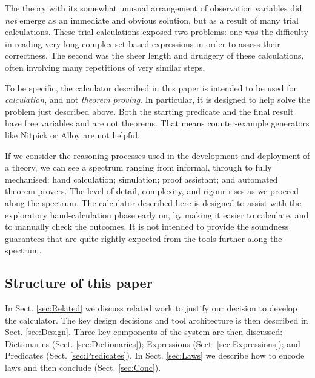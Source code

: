 The theory with its somewhat unusual arrangement of observation variables
did \emph{not} emerge as an immediate and obvious solution,
but as a result of many trial calculations.
These trial calculations exposed two problems:
one was the difficulty in reading very long complex
set-based expressions in order to assess their correctness.
The second was the sheer length and drudgery of these calculations,
often involving many repetitions of very similar steps.

To be specific, the calculator described in this paper
is intended to be used for \emph{calculation}, and not \emph{theorem proving}.
In particular, it is designed to help solve the problem
just described above.
Both the starting predicate and the final result have free variables
and are not theorems.
That means counter-example generators
like Nitpick or Alloy
are not helpful.


If we consider the reasoning processes used in the development
and deployment of a theory, we can see a spectrum ranging from informal,
through to fully mechanised: hand calculation; simulation; proof assistant;
and automated theorem provers.
The level of detail, complexity,
and rigour rises as we proceed along the spectrum.
The calculator described here is designed
to assist with the exploratory hand-calculation phase early on,
by making it easier to calculate, and to manually check the outcomes.
It is not intended to provide the soundness guarantees that are quite rightly
expected from the tools further along the spectrum.


\subsection{Structure of this paper}

In Sect. \ref{sec:Related} we discuss related work
to justify our decision to develop the calculator.
The key design decisions and tool architecture is then described
in Sect. \ref{sec:Design}.
Three key components of the system are then discussed:
Dictionaries (Sect. \ref{sec:Dictionaries});
Expressions (Sect. \ref{sec:Expressions}); and
Predicates (Sect. \ref{sec:Predicates}).
In Sect. \ref{sec:Laws} we describe how to encode laws
and then conclude (Sect. \ref{sec:Conc}).
